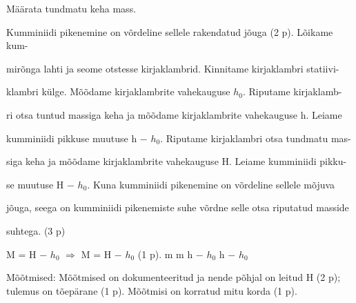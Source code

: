 
Määrata tundmatu keha mass.

\hint

\solu
Kumminiidi pikenemine on võrdeline sellele rakendatud jõuga (2 p). Lõikame kum-

mirõnga lahti ja seome otstesse kirjaklambrid. Kinnitame kirjaklambri statiivi-

klambri külge. Mõõdame kirjaklambrite vahekauguse $h_0$. Riputame kirjaklamb-

ri otsa tuntud massiga keha ja mõõdame kirjaklambrite vahekauguse h. Leiame

kumminiidi pikkuse muutuse h $-$ $h_0$. Riputame kirjaklambri otsa tundmatu mas-

siga keha ja mõõdame kirjaklambrite vahekauguse H. Leiame kumminiidi pikku-

se muutuse H $-$ $h_0$. Kuna kumminiidi pikenemine on võrdeline sellele mõjuva

jõuga, seega on kumminiidi pikenemiste suhe võrdne selle otsa riputatud masside

suhtega. (3 p)

M = H $-$ $h_0$ $\Rightarrow$ M = H $-$ $h_0$ (1 p). m m h $-$ $h_0$ h $-$ $h_0$

Mõõtmised: Mõõtmised on dokumenteeritud ja nende põhjal on leitud H (2 p); tulemus on tõepärane (1 p). Mõõtmisi on korratud mitu korda (1 p).
\probend
